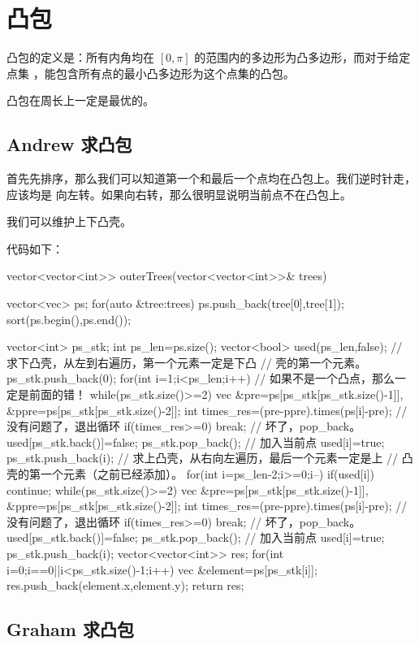 \section{凸包}
凸包的定义是：所有内角均在 $[0, \pi]$ 的范围内的多边形为凸多边形，而对于给定点集
，能包含所有点的最小凸多边形为这个点集的凸包。

凸包在周长上一定是最优的。

\subsection{Andrew 求凸包} \label{subsec:Andrew求凸包}
首先先排序，那么我们可以知道第一个和最后一个点均在凸包上。我们逆时针走，应该均是
向左转。如果向右转，那么很明显说明当前点不在凸包上。

我们可以维护上下凸壳。

代码如下：
\begin{Cpp}
vector<vector<int>>
outerTrees(vector<vector<int>>& trees) {
  vector<vec> ps;
  for(auto &tree:trees) {
    ps.push_back({tree[0],tree[1]});
  }
  sort(ps.begin(),ps.end());
  
  vector<int> ps_stk;
  int ps_len=ps.size();
  vector<bool> used(ps_len,false);
  // 求下凸壳，从左到右遍历，第一个元素一定是下凸
  // 壳的第一个元素。
  ps_stk.push_back(0);
  for(int i=1;i<ps_len;i++){
    // 如果不是一个凸点，那么一定是前面的错！
    while(ps_stk.size()>=2){
      vec &pre=ps[ps_stk[ps_stk.size()-1]],
        &ppre=ps[ps_stk[ps_stk.size()-2]];
      int times_res=(pre-ppre).times(ps[i]-pre);
      // 没有问题了，退出循环
      if(times_res>=0) {
        break;
      }
      // 坏了，pop_back。
      used[ps_stk.back()]=false;
      ps_stk.pop_back();
    }
    // 加入当前点
    used[i]=true;
    ps_stk.push_back(i);
  }
  // 求上凸壳，从右向左遍历，最后一个元素一定是上
  // 凸壳的第一个元素（之前已经添加）。
  for(int i=ps_len-2;i>=0;i--) {
    if(used[i]) continue;
    while(ps_stk.size()>=2) {
      vec &pre=ps[ps_stk[ps_stk.size()-1]],
        &ppre=ps[ps_stk[ps_stk.size()-2]];
      int times_res=(pre-ppre).times(ps[i]-pre);
      // 没有问题了，退出循环
      if(times_res>=0) {
        break;
      }
      // 坏了，pop_back。
      used[ps_stk.back()]=false;
      ps_stk.pop_back();
    }
    // 加入当前点
    used[i]=true;
    ps_stk.push_back(i);
  }
  vector<vector<int>> res;
  for(int i=0;i==0||i<ps_stk.size()-1;i++) {
    vec &element=ps[ps_stk[i]];
    res.push_back({element.x,element.y});
  }
  return res;
}
\end{Cpp}

\subsection{Graham 求凸包}


